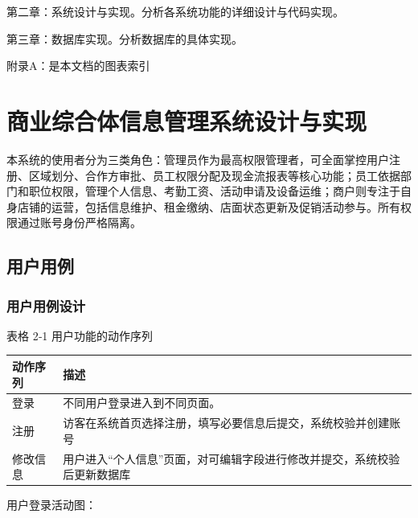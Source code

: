 \documentclass[]{article}
\begin{document}
第二章：系统设计与实现。分析各系统功能的详细设计与代码实现。

第三章：数据库实现。分析数据库的具体实现。

附录A：是本文档的图表索引

\hypertarget{ux5546ux4e1aux7efcux5408ux4f53ux4fe1ux606fux7ba1ux7406ux7cfbux7edfux8bbeux8ba1ux4e0eux5b9eux73b0}{%
\section{商业综合体信息管理系统设计与实现}\label{ux5546ux4e1aux7efcux5408ux4f53ux4fe1ux606fux7ba1ux7406ux7cfbux7edfux8bbeux8ba1ux4e0eux5b9eux73b0}}

本系统的使用者分为三类角色：管理员作为最高权限管理者，可全面掌控用户注册、区域划分、合作方审批、员工权限分配及现金流报表等核心功能；员工依据部门和职位权限，管理个人信息、考勤工资、活动申请及设备运维；商户则专注于自身店铺的运营，包括信息维护、租金缴纳、店面状态更新及促销活动参与。所有权限通过账号身份严格隔离。

\hypertarget{ux7528ux6237ux7528ux4f8b}{%
\subsection{ 用户用例}\label{ux7528ux6237ux7528ux4f8b}}

\hypertarget{ux7528ux6237ux7528ux4f8bux8bbeux8ba1}{%
\subsubsection{用户用例设计}\label{ux7528ux6237ux7528ux4f8bux8bbeux8ba1}}

\protect\hypertarget{_Toc153186375}{}{\protect\hypertarget{_Toc394245026}{}{}}表格
2‑1 用户功能的动作序列

\begin{longtable}[]{@{}ll@{}}
\toprule
动作序列 & 描述\tabularnewline
\midrule
\endhead
登录 & 不同用户登录进入到不同页面。\tabularnewline
注册 &
访客在系统首页选择注册，填写必要信息后提交，系统校验并创建账号\tabularnewline
修改信息 &
用户进入``个人信息''页面，对可编辑字段进行修改并提交，系统校验后更新数据库\tabularnewline
\bottomrule
\end{longtable}

用户登录活动图：
\end{document}
